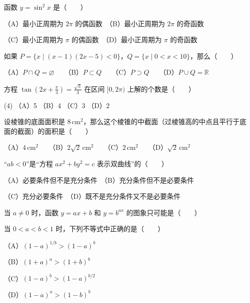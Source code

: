 \begin{question}
函数 $y=\sin^2 x$ 是\mbox{（　　）}

（A）最小正周期为 $2\pi$ 的偶函数　（B）最小正周期为 $2\pi$ 的奇函数

（C）最小正周期为 $\pi$ 的偶函数　（D）最小正周期为 $\pi$ 的奇函数

\end{question}
\begin{question}
如果 $P=\{x\mid(x-1)(2x-5)<0\}$，$Q=\{x\mid0<x<10\}$，那么\mbox{（　　）}

（A）$P\cap Q=\varnothing$　　（B）$P\subset Q$　　（C）$P\supset Q$　　（D）$P\cup Q=\mathbb R$

\end{question}
\begin{question}
方程 $\tan\left(2x+\frac\pi3\right)=\frac{\sqrt3}{3}$ 在区间 $[0,2\pi)$ 上解的个数是\mbox{（　　）}

\begin{gkopts}(4)
\task （A）5
\task （B）4
\task （C）3
\task （D）2
\end{gkopts}

\end{question}
\begin{question}
设棱锥的底面面积是 $8\,\mathrm{cm}^2$，那么这个棱锥的中截面（过棱锥高的中点\allowbreak 且平行于底面的截面）的面积是\allowbreak\mbox{（　　）}

（A）$4\,\mathrm{cm}^2$　　（B）$2\sqrt2\,\mathrm{cm}^2$　　（C）$2\,\mathrm{cm}^2$　　（D）$\sqrt2\,\mathrm{cm}^2$

\end{question}
\begin{question}
“$ab<0$”是“方程 $ax^2+by^2=c$ 表示双曲线”的\mbox{（　　）}

（A）必要条件但不是充分条件　（B）充分条件但不是必要条件

（C）充分必要条件　（D）既不是充分条件又不是必要条件

\Needspace{0.4\textheight}
\end{question}
\begin{question}
当 $a\ne0$ 时，函数 $y=ax+b$ 和 $y=b^{ax}$ 的图象只可能是\mbox{（　　）}
\nopagebreak[4]
\begin{center}\end{center}
\nopagebreak[4]
\end{question}
\begin{question}
当 $0<a<b<1$ 时，下列不等式中正确的是\mbox{（　　）}

（A）$(1-a)^{1/b}>(1-a)^b$

（B）$(1+a)^a>(1+b)^b$

（C）$(1-a)^b>(1-a)^{b/2}$

（D）$(1-a)^a>(1-b)^b$

\end{question}
